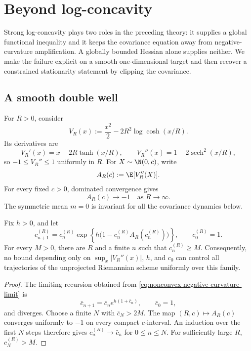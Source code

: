 \section{Beyond log-concavity}
\label{sec:nonconvex}

Strong log-concavity plays two roles in the preceding theory: it supplies a
global functional inequality and it keeps the covariance equation away from
negative-curvature amplification.  A globally bounded Hessian alone supplies
neither.  We make the failure explicit on a smooth one-dimensional target and
then recover a constrained stationarity statement by clipping the covariance.

\subsection{A smooth double well}
\label{sec:nonconvex-double-well}

For \(R>0\), consider
\begin{equation}
  V_R(x)
  :=
  \frac{x^2}{2}-2R^2\log\cosh(x/R).
  \label{eq:nonconvex-potential}
\end{equation}
Its derivatives are
\[
  V_R'(x)=x-2R\tanh(x/R),
  \qquad
  V_R''(x)=1-2\operatorname{sech}^2(x/R),
\]
so \(-1\leq V_R''\leq1\) uniformly in \(R\).  For
\(X\sim\N(0,c)\), write
\[
  A_R(c):=\E[V_R''(X)].
\]
For every fixed \(c>0\), dominated convergence gives
\begin{equation}
  A_R(c)\longrightarrow-1
  \quad\text{as }R\to\infty.
  \label{eq:nonconvex-negative-curvature-limit}
\end{equation}
The symmetric mean \(m=0\) is invariant for all the covariance dynamics below.

\begin{proposition}
\label{prop:nonconvex-riemannian-cascade}
Fix \(h>0\), and let
\begin{equation}
  c_{n+1}^{(R)}
  =
  c_n^{(R)}
  \exp\!\left\{h\bigl(1-c_n^{(R)}A_R(c_n^{(R)})\bigr)\right\},
  \qquad c_0^{(R)}=1.
  \label{eq:nonconvex-riemannian-map}
\end{equation}
For every \(M>0\), there are \(R\) and a finite \(n\) such that
\(c_n^{(R)}\geq M\).  Consequently, no bound depending only on
\(\sup_x|V_R''(x)|\), \(h\), and \(c_0\) can control all trajectories of the
unprojected Riemannian scheme uniformly over this family.
\end{proposition}

\begin{proof}
The limiting recursion obtained from
\eqref{eq:nonconvex-negative-curvature-limit} is
\[
  \bar c_{n+1}=\bar c_n e^{h(1+\bar c_n)},\qquad \bar c_0=1,
\]
and diverges.  Choose a finite \(N\) with \(\bar c_N>2M\).
The map \((R,c)\mapsto A_R(c)\) converges uniformly to \(-1\) on every
compact \(c\)-interval.  An induction over the first \(N\) steps therefore
gives \(c_n^{(R)}\to\bar c_n\) for \(0\leq n\leq N\).
For sufficiently large \(R\), \(c_N^{(R)}>M\).
\end{proof}


